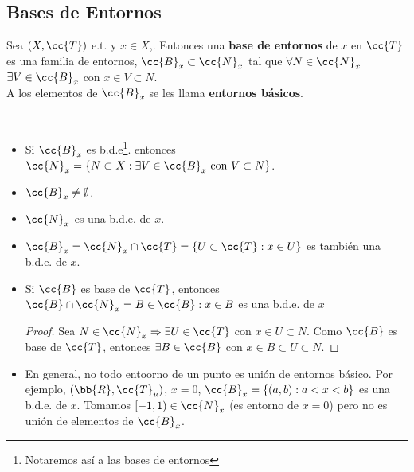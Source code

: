 \subsection{Bases de Entornos}

\begin{definicion}
    Sea $(X, \cc{T})$ e.t. y $x\in X $,. Entonces una \textbf{base de entornos} de $x$ en $\cc{T}$ es una familia de entornos, $\cc{B}_x\subset \cc{N}_x$ tal que $\forall N \in \cc{N}_x$\ \ $\exists V \in \cc{B}_x$ con $x \in V \subset N$.\\

    A los elementos de $\cc{B}_x$ se les llama \textbf{entornos básicos}.
    \endsquare
\end{definicion}

\begin{observacion}\
    \begin{itemize}
        \item Si $\cc{B}_x$ es b.d.e\footnote{Notaremos así a las bases de entornos}. entonces $\cc{N}_x=\{N\subset X : \exists V \in \cc{B}_x \text{ con } V \subset N\}$.

        \item $\cc{B}_x\neq \emptyset$.

        \item $\cc{N}_x$ es una b.d.e. de $x$.

        \item $\cc{B}_x = \cc{N}_x \cap \cc{T}=\{U\subset \cc{T}: x\in U\}$ es también una b.d.e. de $x$.

        \item Si $\cc{B}$ es base de $\cc{T}$, entonces $\cc{B}\cap \cc{N}_x = B \in \cc{B} : x \in B$ es una b.d.e. de $x$
        \begin{proof}
            Sea $N \in \cc{N}_x \Rightarrow \exists U \in \cc{T}$ con $x \in U \subset N$. Como $\cc{B}$ es base de $\cc{T}$, entonces $\exists B \in \cc{B}$ con $x\in B \subset U\subset N$. 
        \end{proof}

        \item En general, no todo entoorno de un punto es unión de entornos básico. Por ejemplo, $(\bb{R}, \cc{T}_u)$, $x=0$, $\cc{B}_x = \{(a,b) : a<x<b\}$ es una b.d.e. de $x$. Tomamos $[-1,1) \in \cc{N}_x$ (es entorno de $x=0$) pero no es unión de elementos de $\cc{B}_x$.
    \end{itemize}
    \endsquare
\end{observacion}

